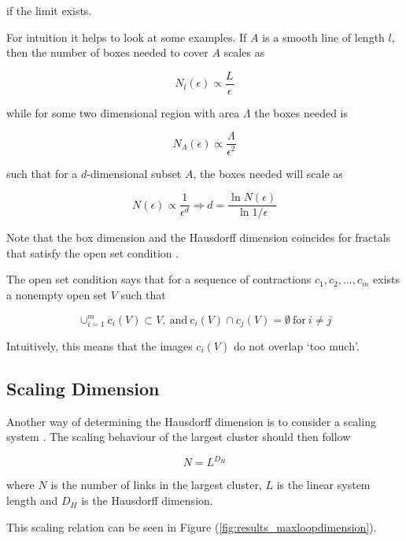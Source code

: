 if the limit exists.

For intuition it helps to look at some examples. If $A$ is a smooth line of length $l$, then the number of boxes needed to cover $A$ scales as

\begin{equation}
    N_l(\epsilon) \propto \frac{L}{\epsilon}
\end{equation}

while for some two dimensional region with area $\Lambda$ the boxes needed is

\begin{equation}
    N_{\Lambda}(\epsilon) \propto \frac{\Lambda}{\epsilon^2}
\end{equation}

such that for a $d$-dimensional subset $A$, the boxes needed will scale as

\begin{equation}
    N (\epsilon) \propto \frac{1}{\epsilon^d} \Rightarrow d = \frac{\ln N(\epsilon)}{\ln 1 / \epsilon}
\end{equation}

Note that the box dimension and the Hausdorff dimension coincides for fractals that satisfy the open set condition \cite{Falconer:RelHausdorffBox}.

The open set condition says that for a sequence of contractions $c_1, c_2, ..., c_m$ exists a nonempty open set $V$ such that \cite{Bandt:OSC}

\begin{equation}
    \cup_{i = 1}^m c_i(V) \subset V, \ \text{and} \ c_i(V) \cap c_j(V) = \emptyset \ \text{for} \ i \neq j
\end{equation}

Intuitively, this means that the images $c_i(V)$ do not overlap `too much'.

\subsection{Scaling Dimension}
\label{subsec:ScalingDimension}

Another way of determining the Hausdorff dimension is to consider a scaling system \cite{Camarda:MethodsDetermineHausdorff}. The scaling behaviour of the largest cluster should then follow

\begin{equation}
    N = L^{D_H}
\end{equation}

where $N$ is the number of links in the largest cluster, $L$ is the linear system length and $D_H$ is the Hausdorff dimension.

This scaling relation can be seen in Figure (\ref{fig:results_maxloopdimension}).



